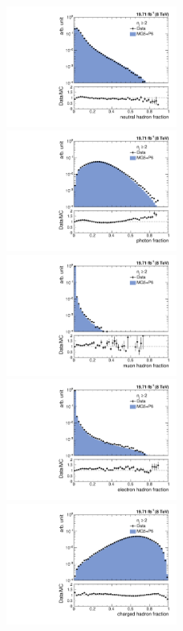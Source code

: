 \begin{figure}[!htbp]
 \begin{center}
 \includegraphics[width=0.5\textwidth]{Plots_HT_2_150/Comparison_NuHadFrac_2_HT_2_150.pdf}%
 ~~\includegraphics[width=0.5\textwidth]{Plots_HT_2_150/Comparison_PhFrac_2_HT_2_150.pdf}\\
 \includegraphics[width=0.5\textwidth]{Plots_HT_2_150/Comparison_MuFrac_2_HT_2_150.pdf}%
 ~~\includegraphics[width=0.5\textwidth]{Plots_HT_2_150/Comparison_ElFrac_2_HT_2_150.pdf}\\
 \includegraphics[width=0.5\textwidth]{Plots_HT_2_150/Comparison_ChHadFrac_2_HT_2_150.pdf}

\end{center}
\end{figure}
